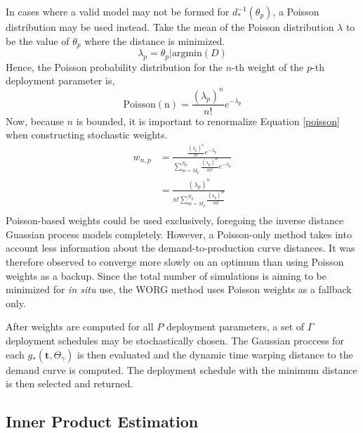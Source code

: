 In cases where a valid model may not be formed for $d_*^{-1}(\theta_p)$, 
a Poisson distribution may be used instead.  Take the mean of the Poisson
distribution $\lambda$ to be the value of $\theta_p$ where the distance
is minimized.
\begin{equation}
\label{lambda}
\lambda_p = \theta_p | \mathrm{argmin}(D) 
\end{equation}
Hence, the Poisson probability distribution for the $n$-th weight of the
$p$-th deployment parameter is, 
\begin{equation}
\label{poisson}
\mathrm{Poisson(n)} = \frac{(\lambda_p)^n}{n!} e^{-\lambda_p}
\end{equation}
Now, because $n$ is bounded, it is important to renormalize Equation 
\ref{poisson} when constructing stochastic weights.
\begin{equation}
\label{poisson-w}
\begin{split}
w_{n,p} & = \frac{\frac{(\lambda_p)^n}{n!} e^{-\lambda_p}}
                 {\sum_{m=M_p}^{N_p} \frac{(\lambda_p)^m}{m!} e^{-\lambda_p}}\\
        & = \frac{(\lambda_p)^n}
                 {n!\sum_{m=M_p}^{N_p} \frac{(\lambda_p)^m}{m!}}\\
\end{split}
\end{equation}
Poisson-based weights could be used exclusively, foregoing the inverse 
distance Guassian process models completely. However, a Poisson-only 
method takes into account less information about the demand-to-production
curve distances. It was therefore observed to converge more slowly 
on an optimum than using Poisson weights as a backup.  Since the total 
number of simulations is aiming to be minimized for \emph{in situ} use, 
the WORG method uses Poisson weights as a fallback only.

After weights are computed for all $P$ deployment parameters, a set of 
$\Gamma$ deployment schedules may be stochastically chosen. The Gaussian
proccess for each $g_*(\mathbf{t}, \Theta_\gamma)$ is then evaluated and the
dynamic time warping distance to the demand curve is computed. The 
deployment schedule with the minimum distance is then selected and returned.



\subsection{Inner Product Estimation}
\label{inner-prod}

